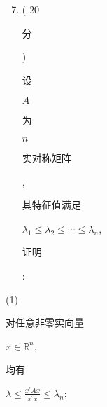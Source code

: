\documentclass[10pt]{article}
\begin{document}
\begin{enumerate}
  \setcounter{enumi}{6}
  \item ( 20 \begin{CJK}{UTF8}{mj}分\end{CJK}) \begin{CJK}{UTF8}{mj}设\end{CJK} $A$ \begin{CJK}{UTF8}{mj}为\end{CJK} $n$ \begin{CJK}{UTF8}{mj}实对称矩阵\end{CJK}, \begin{CJK}{UTF8}{mj}其特征值满足\end{CJK} $\lambda_{1} \leqslant \lambda_{2} \leqslant \cdots \leqslant \lambda_{n}$, \begin{CJK}{UTF8}{mj}证明\end{CJK}:
\end{enumerate}
(1) \begin{CJK}{UTF8}{mj}对任意非零实向量\end{CJK} $x \in \mathbb{R}^{n}$, \begin{CJK}{UTF8}{mj}均有\end{CJK} $\lambda \leqslant \frac{x^{\prime} A x}{x^{\prime} x} \leqslant \lambda_{n}$;
\end{document}
